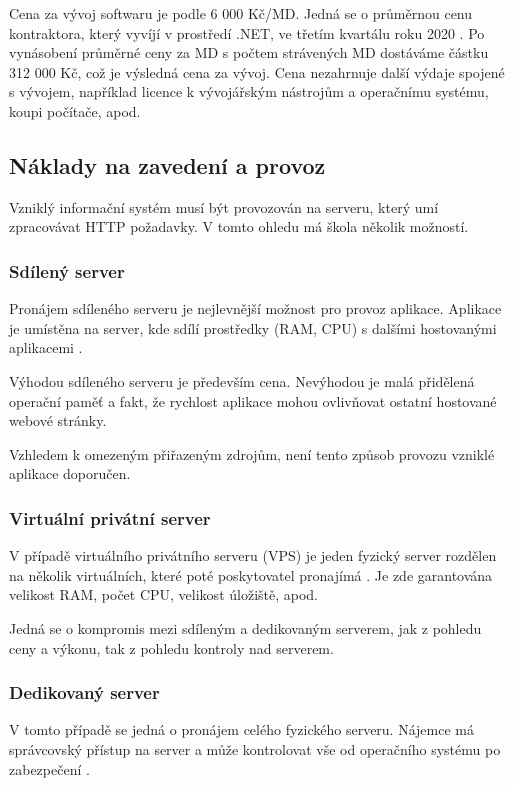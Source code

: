 Cena za vývoj softwaru je podle \cite{md-benchmark} 6 000 Kč/MD. Jedná se o průměrnou cenu kontraktora, který vyvíjí v prostředí .NET, ve třetím kvartálu roku 2020 \cite{md-benchmark}. Po vynásobení průměrné ceny za MD s počtem strávených MD dostáváme částku 312 000 Kč, což je výsledná cena za vývoj. Cena nezahrnuje další výdaje spojené s vývojem, například licence k vývojářským nástrojům a operačnímu systému, koupi počítače, apod.

\subsection{Náklady na zavedení a provoz}
Vzniklý informační systém musí být provozován na serveru, který umí zpracovávat HTTP požadavky. V tomto ohledu má škola několik možností.

\subsubsection*{Sdílený server}
Pronájem sdíleného serveru je nejlevnější možnost pro provoz aplikace. Aplikace je umístěna na server, kde sdílí prostředky (RAM, CPU) s dalšími hostovanými aplikacemi \cite{webhosting-difference}.

Výhodou sdíleného serveru je především cena. Nevýhodou je malá přidělená operační paměť a fakt, že rychlost aplikace mohou ovlivňovat ostatní hostované webové stránky.

Vzhledem k omezeným přiřazeným zdrojům, není tento způsob provozu vzniklé aplikace doporučen.

\subsubsection*{Virtuální privátní server}
V případě virtuálního privátního serveru (VPS) je jeden fyzický server rozdělen na několik virtuálních, které poté poskytovatel pronajímá \cite{webhosting-difference}. Je zde garantována velikost RAM, počet CPU, velikost úložiště, apod.

Jedná se o kompromis mezi sdíleným a dedikovaným serverem, jak z pohledu ceny a výkonu, tak z pohledu kontroly nad serverem.

\subsubsection*{Dedikovaný server}
V tomto případě se jedná o pronájem celého fyzického serveru. Nájemce má správcovský přístup na server a může kontrolovat vše od operačního systému po zabezpečení \cite{webhosting-difference}.

